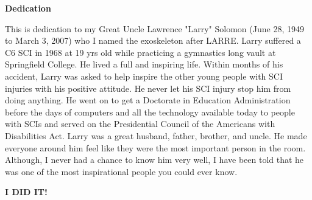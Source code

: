 
\begin{center}
    \textbf{Dedication}
\end{center}
This is dedication to my Great Uncle Lawrence "Larry" Solomon (June 28, 1949 to March 3, 2007) who I named the exoskeleton after LARRE. Larry suffered a C6 SCI in 1968 at 19 yrs old while practicing a gymnastics long vault at Springfield College. He lived a full and inspiring life. Within months of his accident, Larry was asked to help inspire the other young people with SCI injuries with his positive attitude. He never let his SCI injury stop him from doing anything. He went on to get a Doctorate in Education Administration before the days of computers and all the technology available today to people with SCIs and served on the Presidential Council  of the Americans with Disabilities Act. Larry was a great husband, father, brother, and uncle. He made everyone around him feel like they were the most important person in the room. Although, I never had a chance to know him very well, I have been told that he was one of the most inspirational people you could ever know.
\begin{center}
\Large
\textbf{I DID IT!}     
\end{center}

\clearpage

